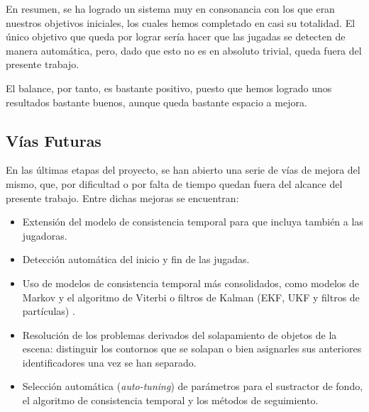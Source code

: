 En resumen, se ha logrado un sistema muy en consonancia con los que eran nuestros objetivos iniciales, los cuales hemos completado en casi su totalidad. El único objetivo que queda por lograr sería hacer que las jugadas se detecten de manera automática, pero, dado que esto no es en absoluto trivial, queda fuera del presente trabajo. 

El balance, por tanto, es bastante positivo, puesto que hemos logrado unos resultados bastante buenos, aunque queda bastante espacio a mejora.

\subsection{Vías Futuras}

En las últimas etapas del proyecto, se han abierto una serie de vías de mejora del mismo, que, por dificultad o por falta de tiempo quedan fuera del alcance del presente trabajo. Entre dichas mejoras se encuentran:
\begin{itemize}
    \item Extensión del modelo de consistencia temporal para que incluya también a las jugadoras.
    \item Detección automática del inicio y fin de las jugadas. 
    \item Uso de modelos de consistencia temporal más consolidados, como modelos de Markov y el algoritmo de Viterbi \cite{Bishop:2006:PRM:1162264} o filtros de Kalman (EKF, UKF y filtros de partículas) \cite{Thrun:2005:PR:1121596}.
    \item Resolución de los problemas derivados del solapamiento de objetos de la escena: distinguir los contornos que se solapan o bien asignarles sus anteriores identificadores una vez se han separado.
    \item Selección automática (\textit{auto-tuning}) de parámetros para el sustractor de fondo, el algoritmo de consistencia temporal y los métodos de seguimiento.
\end{itemize}